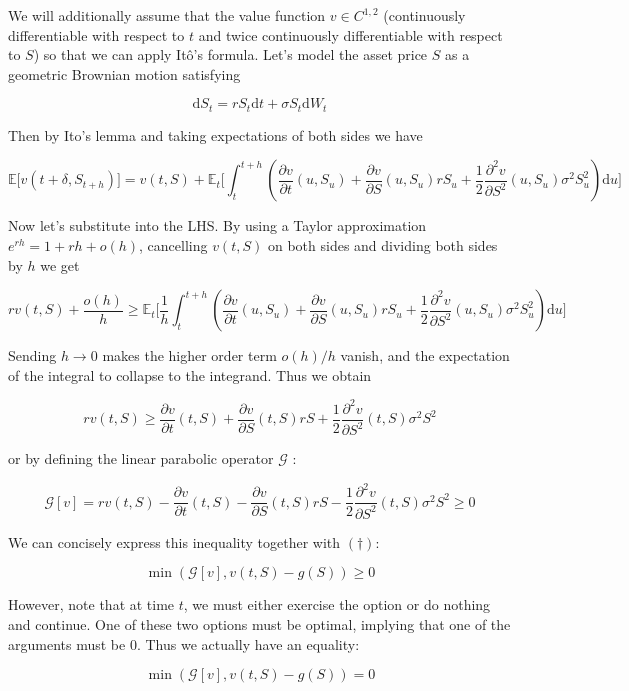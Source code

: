 We will additionally assume that the value function $v \in C^{1,2}$ (continuously differentiable with respect to $t$ and twice continuously differentiable with respect to $S$) so that we can apply Itô's formula. Let's model the asset price $S$ as a geometric Brownian motion satisfying

$$\mathrm dS_t = rS_t \mathrm dt + \sigma S_t \mathrm dW_t$$

Then by Ito’s lemma and taking expectations of both sides we have

$$
\mathbb E\big[v(t +\delta, S_{t+h})\big] = v(t, S) + \mathbb E_t\bigg[\int_t^{t+h} \left(\frac{\partial v}{\partial t}(u, S_u) + \frac{\partial v}{\partial S}(u, S_u) r S_u + \frac{1}{2}\frac{\partial ^2v}{\partial S^2}(u, S_u) \sigma^2 S_u^2\right)\mathrm du\bigg]
$$

Now let’s substitute into the LHS. By using a Taylor approximation $e^{rh} = 1 + rh + o(h)$, cancelling $v(t, S)$ on both sides and dividing both sides by $h$ we get

$$
rv(t, S) + \frac{o(h)}{h} \ge \mathbb E_t\bigg[\frac 1h\int_t^{t+h} \left(\frac{\partial v}{\partial t}(u, S_u) + \frac{\partial v}{\partial S}(u, S_u) r S_u + \frac{1}{2}\frac{\partial ^2v}{\partial S^2}(u, S_u) \sigma^2 S_u^2\right)\mathrm du\bigg]
$$

Sending $h \to 0$ makes the higher order term $o(h)/h$ vanish, and the expectation of the integral to collapse to the integrand. Thus we obtain

$$
rv(t, S) \ge \frac{\partial v}{\partial t}(t, S) + \frac{\partial v}{\partial S}(t, S) r S + \frac{1}{2}\frac{\partial ^2v}{\partial S^2}(t, S) \sigma^2 S^2
$$

or by defining the linear parabolic operator $\mathcal G$ \cite{zhao2025fractional}:

$$\mathcal G[v] = rv(t, S) - \frac{\partial v}{\partial t}(t, S) - \frac{\partial v}{\partial S}(t, S) r S - \frac{1}{2}\frac{\partial ^2v}{\partial S^2}(t, S) \sigma^2 S^2 \ge 0$$

We can concisely express this inequality together with $(\dag)$:

$$
\min\left(\mathcal G[v], v(t, S) - g(S)\right) \ge 0
$$

However, note that at time $t$, we must either exercise the option or do nothing and continue. One of these two options must be optimal, implying that one of the arguments must be $0$. Thus we actually have an equality:

$$
\min\left(\mathcal G[v], v(t, S) - g(S)\right) = 0
$$


